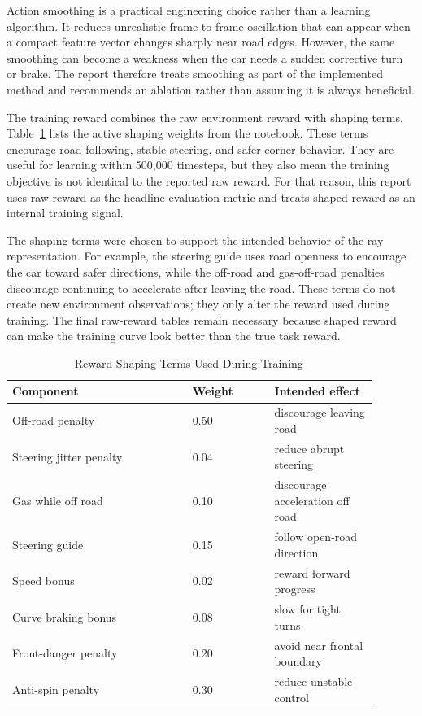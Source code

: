 \documentclass[conference]{IEEEtran}
\begin{document}
Action smoothing is a practical engineering choice rather than a learning algorithm. It reduces unrealistic frame-to-frame oscillation that can appear when a compact feature vector changes sharply near road edges. However, the same smoothing can become a weakness when the car needs a sudden corrective turn or brake. The report therefore treats smoothing as part of the implemented method and recommends an ablation rather than assuming it is always beneficial.

The training reward combines the raw environment reward with shaping terms. Table~\ref{tab:reward} lists the active shaping weights from the notebook. These terms encourage road following, stable steering, and safer corner behavior. They are useful for learning within 500,000 timesteps, but they also mean the training objective is not identical to the reported raw reward. For that reason, this report uses raw reward as the headline evaluation metric and treats shaped reward as an internal training signal.

The shaping terms were chosen to support the intended behavior of the ray representation. For example, the steering guide uses road openness to encourage the car toward safer directions, while the off-road and gas-off-road penalties discourage continuing to accelerate after leaving the road. These terms do not create new environment observations; they only alter the reward used during training. The final raw-reward tables remain necessary because shaped reward can make the training curve look better than the true task reward.

\begin{table}[t]
\caption{Reward-Shaping Terms Used During Training}
\label{tab:reward}
\centering
\scriptsize
\begin{tabular}{p{0.44\linewidth}p{0.20\linewidth}p{0.25\linewidth}}
\toprule
Component & Weight & Intended effect \\
\midrule
Off-road penalty & 0.50 & discourage leaving road \\
Steering jitter penalty & 0.04 & reduce abrupt steering \\
Gas while off road & 0.10 & discourage acceleration off road \\
Steering guide & 0.15 & follow open-road direction \\
Speed bonus & 0.02 & reward forward progress \\
Curve braking bonus & 0.08 & slow for tight turns \\
Front-danger penalty & 0.20 & avoid near frontal boundary \\
Anti-spin penalty & 0.30 & reduce unstable control \\
\bottomrule
\end{tabular}
\end{table}
\end{document}
